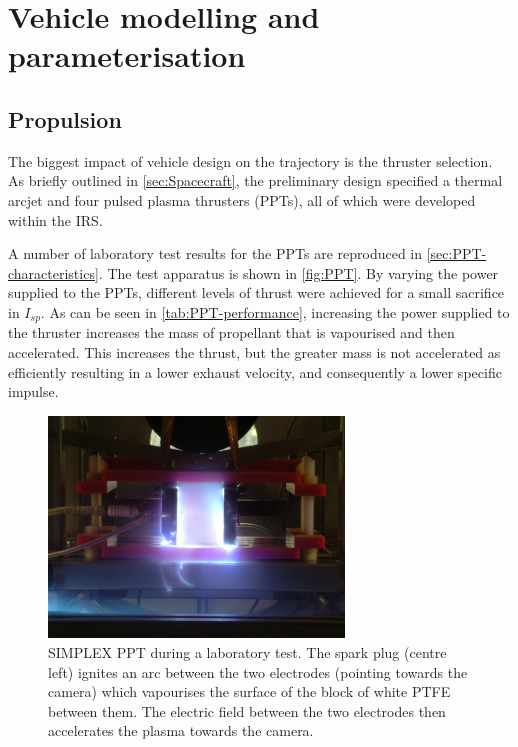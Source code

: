 \chapter{Vehicle modelling and parameterisation}\label{cha:Vehicle}

\section{Propulsion} \label{sec:Propulsion}

The biggest impact of vehicle design on the trajectory is the thruster selection. As briefly outlined in \autoref{sec:Spacecraft}, the preliminary design specified a thermal arcjet and four pulsed plasma thrusters (PPTs), all of which were developed within the IRS. 

A number of laboratory test results for the PPTs are reproduced in \autoref{sec:PPT-characteristics}. The test apparatus is shown in \autoref{fig:PPT}. By varying the power supplied to the PPTs, different levels of thrust were achieved for a small sacrifice in $I_{sp}$. As can be seen in \autoref{tab:PPT-performance}, increasing the power supplied to the thruster increases the mass of propellant that is vapourised and then accelerated. This increases the thrust, but the greater mass is not accelerated as efficiently resulting in a lower exhaust velocity, and consequently a lower specific impulse. 

\begin{figure}
\centering
\includegraphics[width=0.7\textwidth]{Images/PPT_test.JPG}
\caption{SIMPLEX PPT during a laboratory test. The spark plug (centre left) ignites an arc between the two electrodes (pointing towards the camera) which vapourises the surface of the block of white PTFE between them. The electric field between the two electrodes then accelerates the plasma towards the camera.} \label{fig:PPT}
\end{figure}

